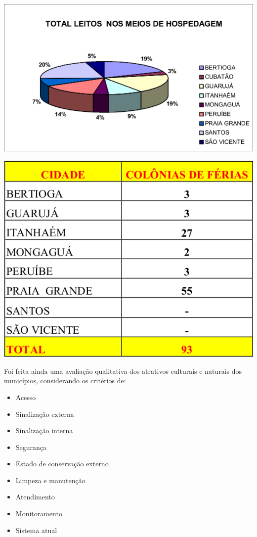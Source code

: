 	\noindent
	\begin{minipage}[b]{.53\textwidth}
		\includegraphics[width=\linewidth]{img/pdtur01.png}
	\end{minipage}%
	\hfill
	\begin{minipage}[b]{.4\linewidth}
		\includegraphics[width=\textwidth]{img/pdtur02.png}
	\end{minipage}
	
	Foi feita ainda uma avaliação qualitativa dos atrativos culturais e naturais dos municípios, considerando os critérios de: 
	
	\begin{itemize}
		\item Acesso
		\item Sinalização externa
		\item Sinalização interna
		\item Segurança
		\item Estado de conservação externo
		\item Limpeza e manutenção
		\item Atendimento
		\item Monitoramento 
		\item Sistema atual	
	\end{itemize}
		
